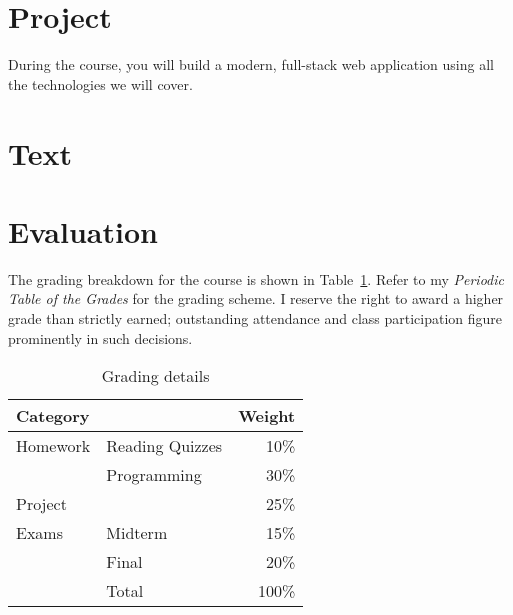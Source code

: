 \documentclass[11pt]{article}
\begin{document}
\section{Project}

During the course,
you will build a modern, full-stack web application
using all the technologies we will cover.

\section{Text}



\section{Evaluation}

The grading breakdown for the course
is shown in Table~\ref{tab:grading}.
Refer to my \emph{Periodic Table of the Grades}
for the grading scheme.
I reserve the right to award a higher grade than strictly earned;
outstanding attendance and class participation
figure prominently in such decisions.

\begin{table}[htb]
  \centering
  \begin{tabular}{llr}
    \toprule
    Category &                 & Weight \\
    \midrule
    Homework & Reading Quizzes & 10\%   \\
             & Programming     & 30\%   \\
    Project  &                 & 25\%   \\
    Exams    & Midterm         & 15\%   \\
             & Final           & 20\%   \\
    \midrule
             & Total           & 100\%  \\
    \bottomrule
  \end{tabular}
  \caption{Grading details}
  \label{tab:grading}
\end{table}
\begin{comment}
#+ORGTBL: SEND grades orgtbl-to-latex :splice nil :skip 0 :booktabs t
| Category |                 | Weight |
|          |                 |    <r> |
|----------+-----------------+--------|
| Homework | Reading Quizzes |    10%
|          | Programming     |    30%
| Project  |                 |    25%
| Exams    | Midterm         |    15%
|          | Final           |    20%
|----------+-----------------+--------|
|          | Total           |   100%
#+TBLFM: @9$3=100*vsum(@I..II);%
\end{comment}
\end{document}
